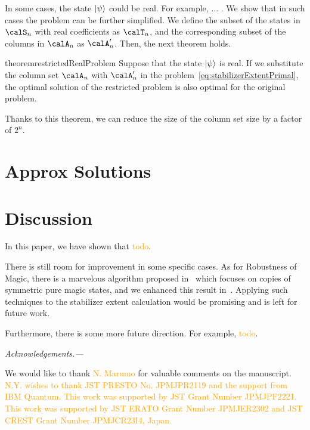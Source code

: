 \documentclass[a4paper, onecolumn, 11pt, longbibliography]{quantumarticle}
\newcommand{\orange}[1]{\textcolor{orange}{#1}}
\begin{document}
In some cases, the state $\ket{\psi}$ could be real.
For example, ... .
We show that in such cases the problem can be further simplified.
We define the subset of the states in $\calS_n$ with real coefficients as $\calT_n$,
and the corresponding subset of the columns in $\calA_n$ as $\calA'_n$.
Then, the next theorem holds.
\begin{restatable}{theorem}{restrictedRealProblem}
    \label{thm:restrictedRealProblem}
    Suppose that the state $\ket{\psi}$ is real.
    If we substitute the column set $\calA_n$ with $\calA'_n$
    in the problem~\eqref{eq:stabilizerExtentPrimal},
    the optimal solution of the restricted problem
    is also optimal for the original problem.
\end{restatable}

Thanks to this theorem,
we can reduce the size of the column set size
by a factor of $2^n$.

\section{Approx Solutions}

\section{Discussion}

In this paper, we have shown that \orange{todo}.

There is still room for improvement
in some specific cases.
As for Robustness of Magic,
there is a marvelous algorithm
proposed in~\cite{Heinrich2019robustnessofmagic}
which focuses on copies of symmetric pure magic states,
and we enhanced this result in~\cite{hamaguchiHandbookEfficientlyQuantifying2023}.
Applying such techniques to the stabilizer extent calculation
would be promising and is left for future work.

Furthermore, there is some more future direction.
For example, \orange{todo}.

\emph{Acknowledgements.---}

We would like to thank \orange{N. Marumo} for valuable comments on the manuscript.
\orange{N.Y. wishes to thank JST PRESTO No. JPMJPR2119 and the support
    from IBM Quantum. This work was supported by JST Grant Number JPMJPF2221.
    This work was supported by JST ERATO Grant Number JPMJER2302 and JST CREST
    Grant Number JPMJCR23I4, Japan.}




\appendix




\end{document}

